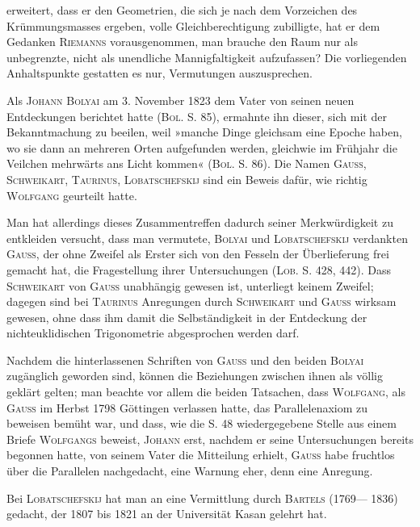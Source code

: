 erweitert, dass er den Geometrien, die sich je nach dem Vorzeichen des
Krümmungsmasses ergeben, volle Gleichberechtigung zubilligte, hat er dem
Gedanken \textsc{Riemanns} vorausgenommen, man brauche den Raum nur als unbegrenzte,
nicht als unendliche Mannigfaltigkeit aufzufassen? Die vorliegenden
Anhaltspunkte gestatten es nur, Vermutungen auszusprechen.
\par
Als \textsc{Johann Bolyai} am 3. November 1823 dem Vater von seinen neuen
Entdeckungen berichtet hatte (\textsc{Bol.} S. 85), ermahnte ihn dieser, sich mit der
Bekanntmachung zu beeilen, weil »manche Dinge gleichsam eine Epoche haben,
wo sie dann an mehreren Orten aufgefunden werden, gleichwie im Frühjahr
die Veilchen mehrwärts ans Licht kommen« (\textsc{Bol.} S. 86). Die Namen \textsc{Gauss},
\textsc{Schweikart}, \textsc{Taurinus}, \textsc{Lobatschefskij} sind ein Beweis dafür, wie richtig \textsc{Wolfgang}
geurteilt hatte.
\par
Man hat allerdings dieses Zusammentreffen dadurch seiner Merkwürdigkeit
zu entkleiden versucht, dass man vermutete, \textsc{Bolyai} und \textsc{Lobatschefskij}
verdankten \textsc{Gauss}, der ohne Zweifel als Erster sich von den Fesseln der Überlieferung
frei gemacht hat, die Fragestellung ihrer Untersuchungen (\textsc{Lob.} S. 428,
442). Dass \textsc{Schweikart} von \textsc{Gauss} unabhängig gewesen ist, unterliegt keinem
Zweifel; dagegen sind bei \textsc{Taurinus} Anregungen durch \textsc{Schweikart} und \textsc{Gauss}
wirksam gewesen, ohne dass ihm damit die Selbständigkeit in der Entdeckung
der nichteuklidischen Trigonometrie abgesprochen werden darf.
\par
Nachdem die hinterlassenen Schriften von \textsc{Gauss} und den beiden \textsc{Bolyai}
zugänglich geworden sind, können die Beziehungen zwischen ihnen als völlig
geklärt gelten; man beachte vor allem die beiden Tatsachen, dass \textsc{Wolfgang},
als \textsc{Gauss} im Herbst 1798 Göttingen verlassen hatte, das Parallelenaxiom zu
beweisen bemüht war, und dass, wie die S. 48 wiedergegebene Stelle aus einem
Briefe \textsc{Wolfgangs} beweist, \textsc{Johann} erst, nachdem er seine Untersuchungen
bereits begonnen hatte, von seinem Vater die Mitteilung erhielt, \textsc{Gauss} habe
\clearpage{}\setcounter{footnote}{0}
\noindent fruchtlos über die Parallelen nachgedacht, eine Warnung eher, denn eine
Anregung.
\par
Bei \textsc{Lobatschefskij} hat man an eine Vermittlung durch \textsc{Bartels} (1769—
1836) gedacht, der 1807 bis 1821 an der Universität Kasan gelehrt hat.
